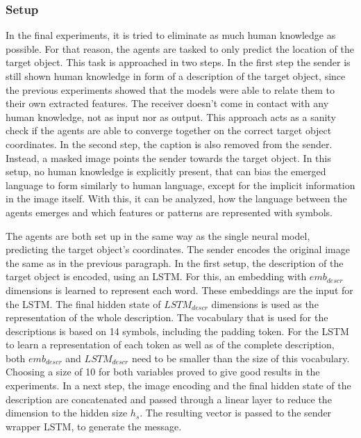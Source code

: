 \subsubsection*{Setup}
In the final experiments, it is tried to eliminate as much human knowledge as possible.
For that reason, the agents are tasked to only predict the location of the target object.
This task is approached in two steps.
In the first step the sender is still shown human knowledge in form of a description of the target object, since the previous experiments showed that the models were able to relate them to their own extracted features.
The receiver doesn't come in contact with any human knowledge, not as input nor as output.
This approach acts as a sanity check if the agents are able to converge together on the correct target object coordinates.
In the second step, the caption is also removed from the sender.
Instead, a masked image points the sender towards the target object.
In this setup, no human knowledge is explicitly present, that can bias the emerged language to form similarly to human language, except for the implicit information in the image itself.
With this, it can be analyzed, how the language between the agents emerges and which features or patterns are represented with symbols.

The agents are both set up in the same way as the single neural model, predicting the target object's coordinates.
The sender encodes the original image the same as in the previous paragraph.
In the first setup, the description of the target object is encoded, using an LSTM.
For this, an embedding with $emb_{descr}$ dimensions is learned to represent each word.
These embeddings are the input for the LSTM.
The final hidden state of $LSTM_{descr}$ dimensions is used as the representation of the whole description.
The vocabulary that is used for the descriptions is based on 14 symbols, including the padding token.
For the LSTM to learn a representation of each token as well as of the complete description, both $emb_{descr}$ and $LSTM_{descr}$ need to be smaller than the size of this vocabulary.
Choosing a size of 10 for both variables proved to give good results in the experiments.
In a next step, the image encoding and the final hidden state of the description are concatenated and passed through a linear layer to reduce the dimension to the hidden size $h_s$.
The resulting vector is passed to the sender wrapper LSTM, to generate the message.

